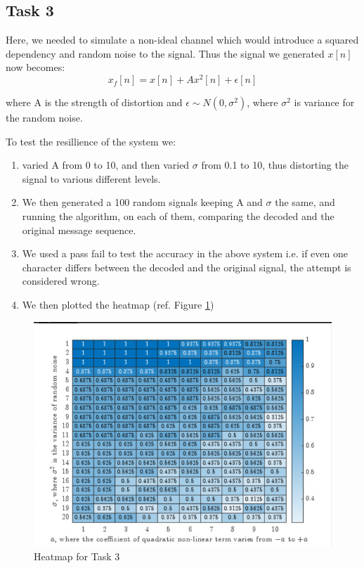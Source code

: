 \documentclass{article}
\begin{document}
\subsection{Task 3}
Here, we needed to simulate a non-ideal channel which would introduce a squared dependency and random noise to the signal. Thus the signal we generated $x[n]$ now becomes:
\begin{equation}
  x_f[n]=x[n]+Ax^2[n]+\epsilon[n]
\end{equation}

where A is the strength of distortion and $\epsilon \sim N(0,\sigma^2)$, where $\sigma^2$ is variance for the random noise.


To test the resillience of the system we:
\begin{enumerate}
  \item varied A from 0 to 10, and then varied $\sigma$ from 0.1 to 10, thus distorting the signal to various different levels. 
  \item We then generated a 100 random signals keeping A and $\sigma$ the same, and running the algorithm, on each of them, comparing the decoded and the original message sequence. 
  \item We used a pass fail to test the accuracy in the above system i.e. if even one character differs between the decoded and the original signal, the attempt is considered wrong. 
  \item We then plotted the heatmap (ref. Figure \ref{fig:heatmap}) 
\end{enumerate}

\begin{figure}[!ht]
\includegraphics[width=\textwidth]{heatmap.jpeg}
\caption{Heatmap for Task 3}
\label{fig:heatmap}
\end{figure}
\clearpage
\end{document}

